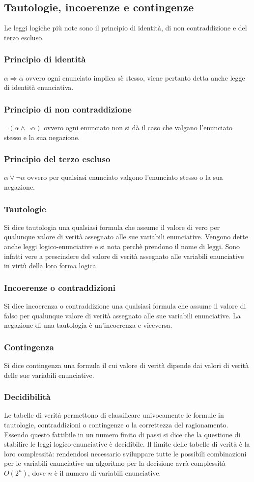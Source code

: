 \subsection{Tautologie, incoerenze e contingenze}
Le leggi logiche pi\`u note sono il principio di identit\`a, di non contraddizione e del terzo escluso.  
\subsubsection{Principio di identit\`a}
$\alpha\Rightarrow \alpha$ ovvero ogni enunciato implica s\`e stesso, viene pertanto detta anche legge di identit\`a enunciativa. 
\subsubsection{Principio di non contraddizione}
$\neg(\alpha\land\neg \alpha)$ ovvero ogni enunciato non si d\`a il caso che valgano l'enunciato stesso e la sua negazione.
\subsubsection{Principio del terzo escluso}
$\alpha\lor\neg \alpha$ ovvero per qualsiasi enunciato valgono l'enunciato stesso o la sua negazione.
\subsubsection{Tautologie}
Si dice tautologia una qualsiasi formula che assume il valore di vero per qualunque valore di verit\`a assegnato alle sue variabili enunciative. Vengono dette anche leggi logico-enunciative e si nota perch\`e 
prendono il nome di leggi. Sono infatti vere a prescindere del valore di verit\`a assegnato alle variabili enunciative in virt\`u della loro forma logica. 
\subsubsection{Incoerenze o contraddizioni}
Si dice incoerenza o contraddizione una qualsiasi formula che assume il valore di falso per qualunque valore di verit\`a assegnato alle sue variabili enunciative. La negazione di una tautologia \`e un'incoerenza e 
viceversa.
\subsubsection{Contingenza}
Si dice contingenza una formula il cui valore di verit\`a dipende dai valori di verit\`a delle sue variabili enunciative. 
\subsubsection{Decidibilit\`a}
Le tabelle di verit\`a permettono di classificare univocamente le formule in tautologie, contraddizioni o contingenze o la correttezza del ragionamento. Essendo questo fattibile in un numero finito di passi si dice 
che la questione di stabilire le leggi logico-enunciative \`e decidibile. Il limite delle tabelle di verit\`a \`e la loro complessit\`a: rendendosi necessario sviluppare tutte le possibili combinazioni per le variabili 
enunciative un algoritmo per la decisione avr\`a complessit\`a $O(2^n)$, dove $n$ \`e il numero di variabili enunciative. 
